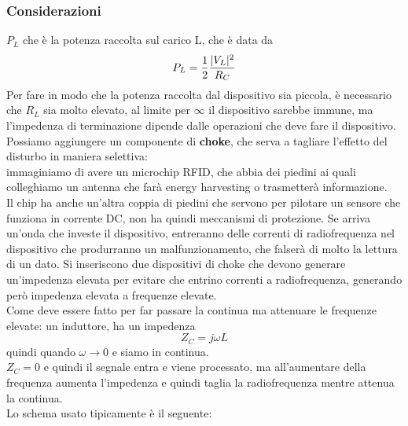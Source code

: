 \documentclass[oneside, 12pt]{extbook}
\DeclarePairedDelimiter{\abs}{\lvert}{\rvert}
\begin{document}
\subsubsection{Considerazioni}
$P_L$ che è la potenza raccolta sul carico L, che è data da 
\begin{equation}
	P_L = \frac{1}{2} \dfrac{\abs{V_L}^2}{R_C}
\end{equation}
Per fare in modo che la potenza raccolta dal dispositivo sia piccola, è necessario che $R_L$ sia molto elevato, al limite per $\infty$ il dispositivo sarebbe immune, ma l'impedenza di terminazione dipende dalle operazioni che deve fare il dispositivo.\\Possiamo aggiungere un componente di \textbf{choke}, che serva a tagliare l'effetto del disturbo in maniera selettiva:\\immaginiamo di avere un microchip RFID, che abbia dei piedini ai quali colleghiamo un antenna che farà energy harvesting o trasmetterà informazione.\\Il chip ha anche un'altra coppia di piedini che servono per pilotare un sensore che funziona in corrente DC, non ha quindi meccanismi di protezione. Se arriva un'onda che investe il dispositivo, entreranno delle correnti di radiofrequenza nel dispositivo che produrranno un malfunzionamento, che falserà di molto la lettura di un dato. Si inseriscono due dispositivi di choke che devono generare un'impedenza elevata per evitare che entrino correnti a radiofrequenza, generando però impedenza elevata a frequenze elevate.\\Come deve essere fatto per far passare la continua ma attenuare le frequenze elevate: un induttore, ha un impedenza 
\begin{equation}
	Z_C = j \omega L	
\end{equation}
quindi quando $\omega \rightarrow 0$ e siamo in continua.\\$Z_C = 0$ e quindi il segnale entra e viene processato, ma all'aumentare della frequenza aumenta l'impedenza e quindi taglia la radiofrequenza mentre attenua la continua.\\Lo schema usato tipicamente è il seguente:\\
\end{document}
